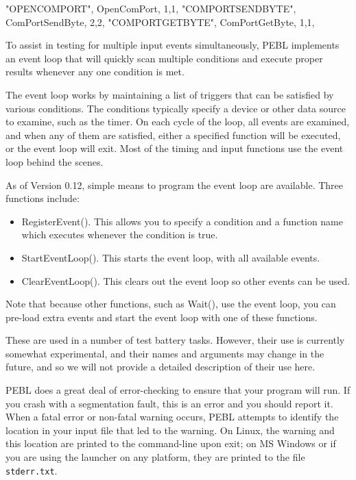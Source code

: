 
            {"OPENCOMPORT",      OpenComPort,          1,1},
            {"COMPORTSENDBYTE",  ComPortSendByte,      2,2},
            {"COMPORTGETBYTE",   ComPortGetByte,       1,1},





To assist in testing for multiple input events simultaneously, 
PEBL implements an event loop that will quickly scan multiple conditions
and execute proper results whenever any one condition is met.  

The event loop works by maintaining a list of triggers that can be satisfied by various conditions. The conditions typically specify a device or other data source to examine, such as the timer.  On each cycle of the loop, all events are examined, and when any of them are satisfied, either a specified function will be executed, or the event loop will exit.  Most of the timing and input functions use the event loop behind the scenes.

As of Version  0.12, simple means to program the event loop are available.  Three functions include:
\begin{itemize}
\item RegisterEvent().  This allows you to specify a condition and a function name which executes whenever the condition is true.      
\item StartEventLoop().  This starts the event loop, with all available events.     
\item ClearEventLoop().  This clears out the event loop so other events can be used.     
\end{itemize}
Note that because other functions, such as Wait(), use the event loop, you can pre-load extra events and start the event loop with one of these functions.

These are used in a number of test battery tasks.  However, their use is currently somewhat experimental, and their names and arguments may change in the future, and so we will not provide a detailed description of their use here.



PEBL does a great deal of error-checking to ensure that your program
will run.  If you crash with a segmentation fault, this is an error
and you should report it.  When a fatal error or non-fatal warning
occurs, PEBL attempts to identify the location in your input file that
led to the warning.  On Linux, the warning and this location are
printed to the command-line upon exit; on MS Windows or if you are using the launcher on any platform, they are printed
to the file \texttt{stderr.txt}.

